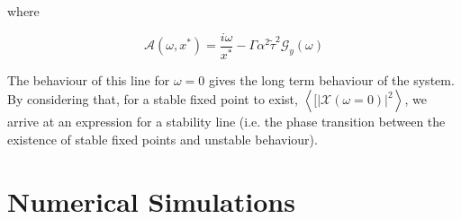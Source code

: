 \documentclass[.../main.tex]{subfiles}
\begin{document}
where

\begin{equation}
	\mathcal{A}(\omega, x^*) = \frac{i \omega}{x^*} - \Gamma \alpha^2 \tilde{\tau}^2 \mathcal{G}_y(\omega)
\end{equation}

The behaviour of this line for $\omega = 0$ gives the long term behaviour of the system. By
considering that, for a stable fixed point to exist, $\left<[|\mathcal{X}(\omega = 0)|^2 \right>$,
we arrive at an expression for a stability line (i.e. the phase transition between the existence of
stable fixed points and unstable behaviour).



\section{Numerical Simulations} %
\label{sec:appnumerical_simulations}
\end{document}
